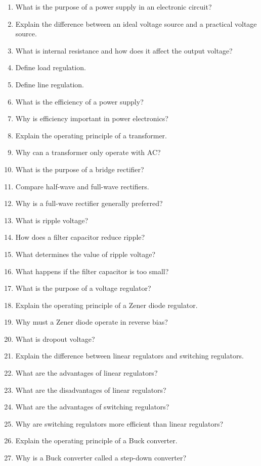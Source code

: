 \documentclass[../main.tex]{subfiles}
\begin{document}
\begin{enumerate}[label=\textbf{\arabic*.}]
	\item What is the purpose of a power supply in an electronic circuit?
	\item Explain the difference between an ideal voltage source and a practical voltage source.
	\item What is internal resistance and how does it affect the output voltage?
	\item Define load regulation.
	\item Define line regulation.
	\item What is the efficiency of a power supply?
	\item Why is efficiency important in power electronics?
	\item Explain the operating principle of a transformer.
	\item Why can a transformer only operate with AC?
	\item What is the purpose of a bridge rectifier?
	\item Compare half-wave and full-wave rectifiers.
	\item Why is a full-wave rectifier generally preferred?
	\item What is ripple voltage?
	\item How does a filter capacitor reduce ripple?
	\item What determines the value of ripple voltage?
	\item What happens if the filter capacitor is too small?
	\item What is the purpose of a voltage regulator?
	\item Explain the operating principle of a Zener diode regulator.
	\item Why must a Zener diode operate in reverse bias?
	\item What is dropout voltage?
	\item Explain the difference between linear regulators and switching regulators.
	\item What are the advantages of linear regulators?
	\item What are the disadvantages of linear regulators?
	\item What are the advantages of switching regulators?
	\item Why are switching regulators more efficient than linear regulators?
	\item Explain the operating principle of a Buck converter.
	\item Why is a Buck converter called a step-down converter?

\end{enumerate}
\end{document}
